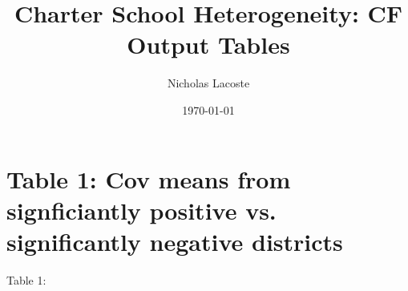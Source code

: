 \documentclass{article} %
\title{Charter School Heterogeneity: CF Output Tables} %
\author{Nicholas Lacoste} %
\date{\today} %
\begin{document}
    \maketitle %

\section{Table 1: Cov means from signficiantly positive vs. significantly negative districts}

Table 1:\\




	
	
	

	
	

	
	

	
	
	 
	

	
	
	


	




	 

 
\end{document}
